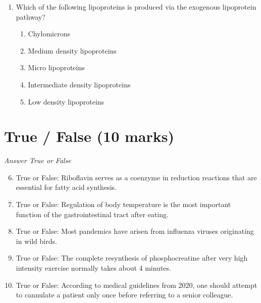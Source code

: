 \documentclass[12pt]{article}
\begin{document}
\begin{enumerate}[label=\arabic*.]
\begin{enumerate}[label=(\alph*)]
    \item One gram of glycerol
    \item One gram of lactose
    \item One gram of fructose
    \item One gram of palmitic acid
    \item One gram of cellulose
\end{enumerate}
\item Which of the following lipoproteins is produced via the exogenous lipoprotein pathway?
\begin{enumerate}[label=(\alph*)]
    \item Chylomicrons
    \item Medium density lipoproteins
    \item Micro lipoproteins
    \item Intermediate density lipoproteins
    \item Low density lipoproteins
\end{enumerate}
\end{enumerate}

\section*{True / False (10 marks)}
\textit{Answer True or False}
\begin{enumerate}[label=\arabic*.]
\setcounter{enumi}{5}
\item True or False: Riboflavin serves as a coenzyme in reduction reactions that are essential for fatty acid synthesis.
\item True or False: Regulation of body temperature is the most important function of the gastrointestinal tract after eating.
\item True or False: Most pandemics have arisen from influenza viruses originating in wild birds.
\item True or False: The complete resynthesis of phosphocreatine after very high intensity exercise normally takes about 4 minutes.
\item True or False: According to medical guidelines from 2020, one should attempt to cannulate a patient only once before referring to a senior colleague.
\end{enumerate}
\end{document}
